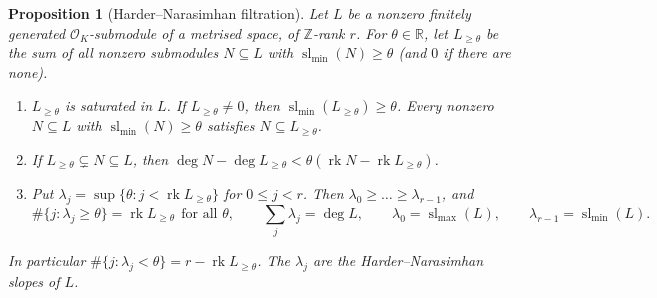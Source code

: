 \documentclass[10pt]{amsart}
\newtheorem{proposition}[theorem]{Proposition}
\theoremstyle{definition}
\theoremstyle{remark}
\newcommand{\R}{\mathbb R}
\newcommand{\Z}{\mathbb Z}
\begin{document}
\begin{proposition}[Harder--Narasimhan filtration]\label{prop:HN}
Let $L$ be a nonzero finitely generated $\mathcal O_K$-submodule of a metrised space, of $\Z$-rank $r$. For $\theta\in\R$, let $L_{\ge\theta}$ be the sum of all nonzero submodules $N\subseteq L$ with $\operatorname{sl}_{\min}(N)\ge\theta$ (and $0$ if there are none).
\begin{enumerate}
\item[(a)] $L_{\ge\theta}$ is saturated in $L$. If $L_{\ge\theta}\neq0$, then $\operatorname{sl}_{\min}(L_{\ge\theta})\ge\theta$. Every nonzero $N\subseteq L$ with $\operatorname{sl}_{\min}(N)\ge\theta$ satisfies $N\subseteq L_{\ge\theta}$.
\item[(b)] If $L_{\ge\theta}\subsetneq N\subseteq L$, then $\deg N-\deg L_{\ge\theta}<\theta(\operatorname{rk}N-\operatorname{rk}L_{\ge\theta})$.
\item[(c)] Put $\lambda_j=\sup\{\theta:j<\operatorname{rk}L_{\ge\theta}\}$ for $0\le j<r$. Then $\lambda_0\ge\dots\ge\lambda_{r-1}$, and
\[
\#\{j:\lambda_j\ge\theta\}=\operatorname{rk}L_{\ge\theta}\ \ \text{for all }\theta,\qquad \sum_j\lambda_j=\deg L,\qquad \lambda_0=\operatorname{sl}_{\max}(L),\qquad \lambda_{r-1}=\operatorname{sl}_{\min}(L).
\]
\end{enumerate}
In particular $\#\{j:\lambda_j<\theta\}=r-\operatorname{rk}L_{\ge\theta}$. The $\lambda_j$ are the \emph{Harder--Narasimhan slopes} of $L$.
\end{proposition}
\end{document}
